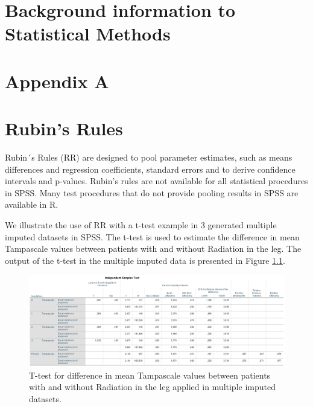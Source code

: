\documentclass[]{book}
\theoremstyle{definition}
\theoremstyle{definition}
\theoremstyle{definition}
\theoremstyle{remark}
\begin{document}
\chapter*{Background information to Statistical
Methods}\label{background-information-to-statistical-methods}

\chapter*{Appendix A}\label{appendix-a}

\chapter{Rubin's Rules}\label{rubins-rules}

Rubin´s Rules (RR) are designed to pool parameter estimates, such as
means differences and regression coefficients, standard errors and to
derive confidence intervals and p-values. Rubin's rules are not
available for all statistical procedures in SPSS. Many test procedures
that do not provide pooling results in SPSS are available in R.

We illustrate the use of RR with a t-test example in 3 generated
multiple imputed datasets in SPSS. The t-test is used to estimate the
difference in mean Tampascale values between patients with and without
Radiation in the leg. The output of the t-test in the multiple imputed
data is presented in Figure \ref{fig:tab9-1}.

\begin{figure}

{\centering \includegraphics[width=0.9\linewidth]{images/table5.1} 

}

\caption{T-test for difference in mean Tampascale values between patients with and without Radiation in the leg applied in multiple imputed datasets.}\label{fig:tab9-1}
\end{figure}
\end{document}
